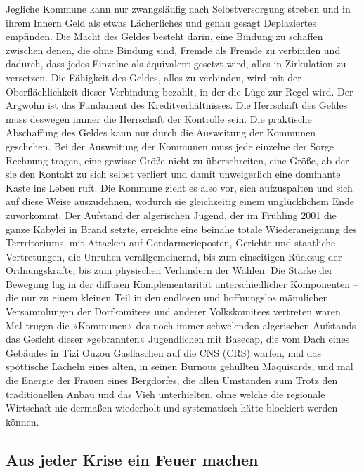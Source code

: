 Jegliche Kommune kann nur zwangsläufig nach Selbstversorgung
streben und in ihrem Innern Geld als etwas Lächerliches und genau
gesagt Deplaziertes empfinden. Die Macht des Geldes besteht darin,
eine Bindung zu schaffen zwischen denen, die ohne Bindung sind,
Fremde als Fremde zu verbinden und dadurch, dass jedes Einzelne als
äquivalent gesetzt wird, alles in Zirkulation zu versetzen. Die
Fähigkeit des Geldes, alles zu verbinden, wird mit der
Oberflächlichkeit dieser Verbindung bezahlt, in der die Lüge zur
Regel wird. Der Argwohn ist das Fundament des Kreditverhältnisses.
Die Herrschaft des Geldes muss deswegen immer die Herrschaft der
Kontrolle sein. Die praktische Abschaffung des Geldes kann nur
durch die Ausweitung der Kommunen geschehen. Bei der Ausweitung der
Kommunen muss jede einzelne der Sorge Rechnung tragen, eine gewisse
Größe nicht zu überschreiten, eine Größe, ab der sie den Kontakt zu
sich selbst verliert und damit unweigerlich eine dominante Kaste
ins Leben ruft. Die Kommune zieht es also vor, sich aufzuspalten
und sich auf diese Weise auszudehnen, wodurch sie gleichzeitig
einem unglücklichem Ende zuvorkommt.
Der Aufstand der algerischen Jugend, der im Frühling 2001 die ganze
Kabylei in Brand setzte, erreichte eine beinahe totale
Wiederaneignung des Terrritoriums, mit Attacken auf
Gendarmerieposten, Gerichte und staatliche Vertretungen, die
Unruhen verallgemeinernd, bis zum einseitigen Rückzug der
Ordnungskräfte, bis zum physischen Verhindern der Wahlen. Die
Stärke der Bewegung lag in der diffusen Komplementarität
unterschiedlicher Komponenten – die nur zu einem kleinen Teil in
den endlosen und hoffnungslos männlichen Versammlungen der
Dorfkomitees und anderer Volkskomitees vertreten waren. Mal trugen
die »Kommunen« des noch immer schwelenden algerischen Aufstands das
Gesicht dieser »gebrannten« Jugendlichen mit Basecap, die vom Dach
eines Gebäudes in Tizi Ouzou Gasflaschen auf die CNS (CRS) warfen,
mal das spöttische Lächeln eines alten, in seinen Burnous gehüllten
Maquisards, und mal die Energie der Frauen eines Bergdorfes, die
allen Umständen zum Trotz den traditionellen Anbau und das Vieh
unterhielten, ohne welche die regionale Wirtschaft nie dermaßen
wiederholt und systematisch hätte blockiert werden können.

\subsection{Aus jeder Krise ein Feuer machen}

